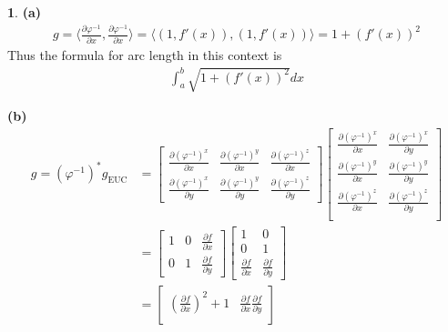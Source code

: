 \documentclass[10.5pt]{article}
\theoremstyle{definition}
\newtheorem{pb}{}
\newcommand{\gen}[1]{\langle #1 \rangle}
\begin{document}
    \begin{pb}
        \textbf{(a)}
        \begin{align*}
            g = \gen{\frac{\partial \varphi^{-1}}{\partial x},\frac{\partial \varphi^{-1}}{\partial x}} = \gen{(1,f'(x)),(1,f'(x))} = 1 + (f'(x))^2
        \end{align*}
        Thus the formula for arc length in this context is
        \begin{align*}
            \int_a^b \sqrt{1 + (f'(x))^2}dx
        \end{align*}

        \textbf{(b)}
        \begin{align*}
            g = (\varphi^{-1})^*g_{\text{EUC}} &= \begin{bmatrix}
                \frac{\partial (\varphi^{-1})^x}{\partial x} & \frac{\partial (\varphi^{-1})^y}{\partial x} & \frac{\partial (\varphi^{-1})^z}{\partial x} \\
                \frac{\partial (\varphi^{-1})^x}{\partial y} & \frac{\partial (\varphi^{-1})^y}{\partial y} & \frac{\partial (\varphi^{-1})^z}{\partial y}
            \end{bmatrix}
            \begin{bmatrix}
                \frac{\partial (\varphi^{-1})^x}{\partial x} & \frac{\partial (\varphi^{-1})^x}{\partial y} \\
                \frac{\partial (\varphi^{-1})^y}{\partial x} & \frac{\partial (\varphi^{-1})^y}{\partial y} \\
                \frac{\partial (\varphi^{-1})^z}{\partial x} & \frac{\partial (\varphi^{-1})^z}{\partial y} \\
            \end{bmatrix} \\
            &= \begin{bmatrix} 1 & 0 & \frac{\partial f}{\partial x} \\
                0 & 1 & \frac{\partial f}{\partial y} \end{bmatrix} 
                \begin{bmatrix} 1 & 0 \\ 0 & 1 \\ \frac{\partial f}{\partial x} & \frac{\partial f}{\partial y} \end{bmatrix} \\
                &= \begin{bmatrix} \left(\frac{\partial f}{\partial x}\right)^2 + 1 & \frac{\partial f}{\partial x}\frac{\partial f}{\partial y} \\

\end{bmatrix}
\end{align*}
\end{pb}
\end{document}

